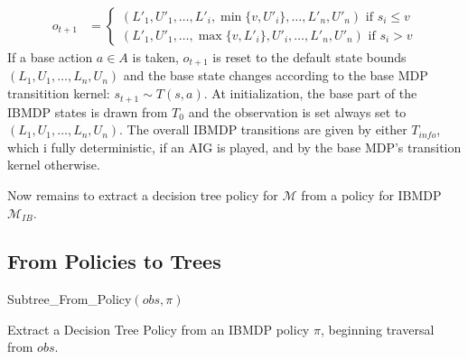 \begin{definition}
\begin{itemize}
\begin{align*}
    o_{t+1} &= \begin{cases}
        (L'_1, U'_1, \dots , L'_i, \min\{v, U'_i\}, \dots , L'_n, U'_n) \text{ if } s_i \leq v\\
        (L'_1, U'_1, \dots , \max\{v, L'_i\}, U'_i, \dots , L'_n, U'_n) \text{ if } s_i > v
    \end{cases}
\end{align*}
If a base action $a\in A$ is taken, $o_{t+1}$ is reset to the default state bounds $(L_1, U_1,\dots, L_n, U_n)$ and the base state changes according to the base MDP transitition kernel: $s_{t+1}\sim T(s, a)$.
At initialization, the base part of the IBMDP states is drawn from $T_0$ and the observation is set always set to $(L_1, U_1,\dots, L_n, U_n)$.
The overall IBMDP transitions are given by either $T_{info}$, which i fully deterministic, if an AIG is played, and by the base MDP's transition kernel otherwise.
\end{itemize}
\end{definition}
Now remains to extract a decision tree policy for $\mathcal{M}$ from a policy for IBMDP $\mathcal{M}_{IB}$. 

\subsection{From Policies to Trees}
\begin{algorithm}[t]
    
    
    
    \Return Subtree\_From\_Policy$(obs, \pi)$
    \caption{Extract a Decision Tree Policy from an IBMDP policy $\pi$, beginning traversal from $obs$.}\label{alg_extract_tree}
\end{algorithm}

